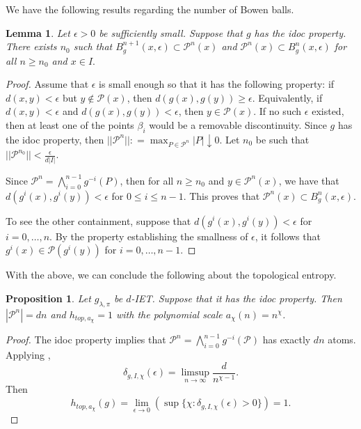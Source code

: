 \documentclass[oneside]{amsart}
\theoremstyle{plain}
\newtheorem{PROP}[THM]{Proposition}
\newtheorem{LEM}[THM]{Lemma}
\theoremstyle{definition}
\newcommand{\dfn}{\mathrel{\mathop:}=}
\newcommand{\<}{\langle}
\renewcommand{\>}{\rangle}
\renewcommand{\P}{\mathcal{P}}
\newcommand{\e}{\epsilon}
\renewcommand{\|}{|\!|} %
\begin{document}
We have the following results regarding the number of Bowen balls. 
\begin{LEM}
\label{lemm:BBallsofIETs}
    Let $\e > 0$ be sufficiently small. Suppose that $g$ has the idoc property. There exists $n_0$ such that $B_g^{n+1}(x,\e) \subset \P^n(x)$ and $\P^n(x) \subset B_g^n(x,\e)$ for all $n\ge n_0$ and $x\in I.$
\end{LEM}
\begin{proof}
    Assume that $\e$ is small enough so that it has the following property: if $d(x,y)< \e$ but $y \not\in \P(x)$, then $d(g(x),g(y)) \ge \e$. Equivalently, if $d(x,y) < \e$ and $d(g(x),g(y)) < \e$, then $y \in \P(x)$. If no such $\e$ existed, then at least one of the points $\beta_i$ would be a removable discontinuity. Since $g$ has the idoc property, then  $||\P^n ||\dfn \max_{P\in\P^n}|P| \downarrow 0$. Let $n_0$ be such that $||\P^{n_0}||<\frac{\e}{d|I|}$.
    
    Since $\P^n = \bigwedge_{i=0}^{n-1}g^{-i}(P)$, then for all $n\geq n_0$ and $y \in \P^{n}(x)$, we have that  $d(g^i(x),g^i(y))<\e$ for $0\le i \le n-1$. This proves that $\P^n(x)\subset B^n_g(x,\e).$

    To see the other containment, suppose that $d(g^i(x),g^i(y)) < \e$ for $i = 0,\dots,n$. By the property establishing the smallness of $\e$, it follows that $g^i(x) \in \P(g^i(y))$ for $i = 0,\dots,n-1$.
\end{proof}

With the above, we can conclude the following about the topological entropy.

\begin{PROP}
\label{prop:TopEntridoc}
    Let $g_{\lambda,\pi}$ be $d$-IET. Suppose that it has the idoc property. Then $|\P^n|=dn$ and  $h_{top,a_\chi}=1$ with the polynomial scale $a_\chi(n)=n^\chi$.
\end{PROP}

\begin{proof}
    The idoc property implies that $\P^n=\bigwedge_{i=0}^{n-1}g^{-i}(\P)$ has exactly $dn$ atoms.
    Applying , 
    \begin{equation*}
        \delta_{g,I,\chi}(\e) = \limsup_{n\to \infty} \frac{d}{n^{\chi-1}}.
    \end{equation*}
    Then 
    \begin{equation*}
        h_{top,a_\chi}(g) = \lim_{\e \to 0}(\sup\{\chi:\delta_{g,I,\chi}(\e)>0\}) = 1.
    \end{equation*}
\end{proof}
\end{document}

